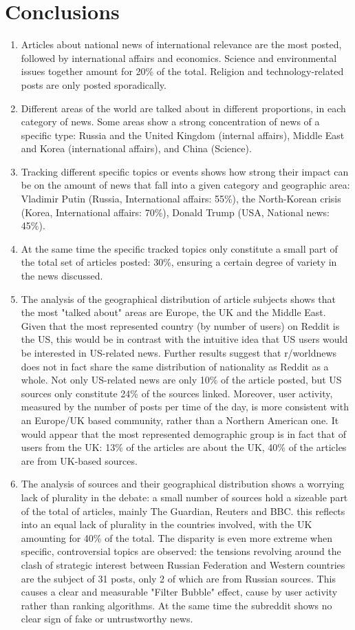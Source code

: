 \documentclass{article}
\begin{document}
\pagebreak
\section{Conclusions}
\begin{enumerate}
\item Articles about national news of international relevance are the most posted, followed by international affairs and economics. Science and environmental issues together amount for 20\% of the total. Religion and technology-related posts are only posted sporadically.
\item Different areas of the world are talked about in different proportions, in each category of news. Some areas show a strong concentration of news of a specific type:  Russia and the United Kingdom (internal affairs), Middle East and Korea (international affairs), and China (Science).
\item Tracking different specific topics or events shows how strong their impact can be on the amount of news that fall into a given category and geographic area: Vladimir Putin (Russia, International affairs: 55\%), the North-Korean crisis (Korea, International affairs: 70\%), Donald Trump (USA, National news: 45\%).
\item At the same time the specific tracked topics only constitute a small part of the total set of articles posted: 30\%, ensuring a certain degree of variety in the news discussed.
\item The analysis of the geographical distribution of article subjects shows that the most "talked about" areas are Europe, the UK and the Middle East. Given that the most represented country (by number of users) on Reddit is the US, this would be in contrast with the intuitive idea that US users would be interested in US-related news. Further results suggest that r/worldnews does not in fact share the same distribution of nationality as Reddit as a whole. Not only US-related news are only 10\% of the article posted, but US sources only constitute 24\% of the sources linked. Moreover, user activity, measured by the number of posts per time of the day, is more consistent with an Europe/UK based community, rather than a Northern American one. It would appear that the most represented demographic group is in fact that of users from the UK: 13\% of the articles are about the UK, 40\% of the articles are from UK-based sources.
\item The analysis of sources and their geographical distribution shows a worrying lack of plurality in the debate: a small number of sources hold a sizeable part of the total of articles, mainly The Guardian, Reuters and BBC. this reflects into an equal lack of plurality in the countries involved, with the UK amounting for 40\% of the total. The disparity is even more extreme when specific, controversial topics are observed: the tensions revolving around the clash of strategic interest between Russian Federation and Western countries are the subject of 31 posts, only 2 of which are from Russian sources. This causes a clear and measurable "Filter Bubble" effect, cause by user activity rather than ranking algorithms. At the same time the subreddit shows no clear sign of fake or untrustworthy news.

\end{enumerate}
\end{document}

